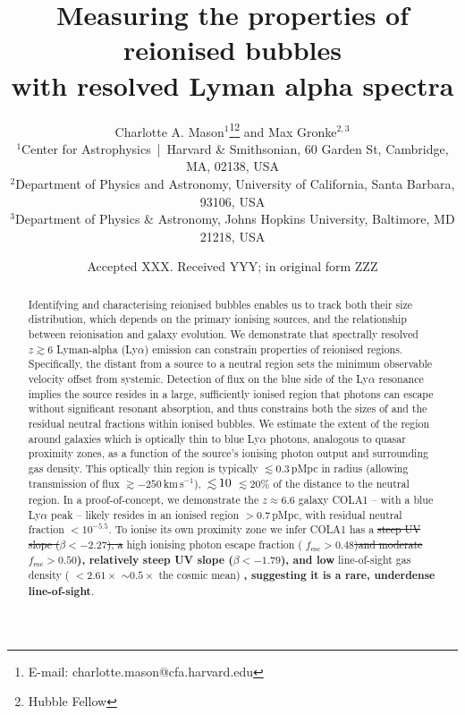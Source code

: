 \documentclass[fleqn,usenatbib]{mnras}
\title[Properties of reionised bubbles]{Measuring the properties of reionised bubbles\\with resolved Lyman alpha spectra}
\author[Mason and Gronke]{Charlotte A. Mason$^{1}$\thanks{E-mail: charlotte.mason@cfa.harvard.edu}\thanks{Hubble Fellow}
and Max Gronke$^{2,3}$\href{Hfootnote.2}{\samethanks}
\\
$^{1}$Center for Astrophysics \,|\, Harvard \& Smithsonian, 60 Garden St, Cambridge, MA, 02138, USA\\
$^{2}$Department of Physics and Astronomy, University of California, Santa Barbara, 93106, USA\\
$^{3}$Department of Physics \& Astronomy, Johns Hopkins University, Baltimore, MD 21218, USA
}
\date{Accepted XXX. Received YYY; in original form ZZZ}
\providecommand{\DIFadd}[1]{{\protect\color{Green} \bf #1}} %
\providecommand{\DIFdel}[1]{{\protect\color{lightgray} \footnotesize \sout{#1}}} %
\providecommand{\DIFaddbegin}{} %
\providecommand{\DIFaddend}{} %
\providecommand{\DIFdelbegin}{} %
\providecommand{\DIFdelend}{} %
\newcommand{\DIFscaledelfig}{0.5}
\newlength{\DIFdelgraphicswidth} %
\newlength{\DIFdelgraphicsheight} %
\newcommand{\DIFaddincludegraphics}[2][]{{\color{blue}\fbox{\DIFOincludegraphics[#1]{#2}}}} %
\newcommand{\DIFdelincludegraphics}[2][]{%
\sbox{\DIFdelgraphicsbox}{\DIFOincludegraphics[#1]{#2}}%
\settoboxwidth{\DIFdelgraphicswidth}{\DIFdelgraphicsbox} %
\settoboxtotalheight{\DIFdelgraphicsheight}{\DIFdelgraphicsbox} %
\scalebox{\DIFscaledelfig}{%
\parbox[b]{\DIFdelgraphicswidth}{\usebox{\DIFdelgraphicsbox}\\[-\baselineskip] \rule{\DIFdelgraphicswidth}{0em}}\llap{\resizebox{\DIFdelgraphicswidth}{\DIFdelgraphicsheight}{%
\setlength{\unitlength}{\DIFdelgraphicswidth}%
\begin{picture}(1,1)%
\thicklines\linethickness{2pt} %
{\color[rgb]{1,0,0}\put(0,0){\framebox(1,1){}}}%
{\color[rgb]{1,0,0}\put(0,0){\line( 1,1){1}}}%
{\color[rgb]{1,0,0}\put(0,1){\line(1,-1){1}}}%
\end{picture}%
}\hspace*{3pt}}} %
} %
\DeclareRobustCommand{\DIFaddbegin}{\DIFOaddbegin \let\includegraphics\DIFaddincludegraphics} %
\DeclareRobustCommand{\DIFaddend}{\DIFOaddend \let\includegraphics\DIFOincludegraphics} %
\DeclareRobustCommand{\DIFdelbegin}{\DIFOdelbegin \let\includegraphics\DIFdelincludegraphics} %
\DeclareRobustCommand{\DIFdelend}{\DIFOaddend \let\includegraphics\DIFOincludegraphics} %
\begin{document}
\label{firstpage}
\pagerange{\pageref{firstpage}--\pageref{lastpage}}
\maketitle

\begin{abstract}
%
Identifying and characterising reionised bubbles enables us to track both their size distribution, which depends on the primary ionising sources, and the relationship between reionisation and galaxy evolution.
%
We demonstrate that spectrally resolved $z\gtrsim6$ Lyman-alpha (Ly$\alpha$) emission can constrain properties of reionised regions.
%
Specifically, the distant from a source to a neutral region sets the minimum observable \lya velocity offset from systemic. Detection of flux on the blue side of the Ly$\alpha$ resonance implies the source resides in a large, sufficiently ionised region that photons can escape without significant resonant absorption, and thus constrains both the sizes of and the residual neutral fractions within ionised bubbles. 
%
We estimate the extent of the region around galaxies which is optically thin to blue Ly$\alpha$ photons, analogous to quasar proximity zones, as a function of the source's ionising photon output and surrounding gas density.
This optically thin region is typically $\lesssim 0.3$\,pMpc in radius (allowing transmission of flux $\gtrsim -250$\,km\,s$^{-1}$), \DIFdelbegin \DIFdel{$\simlt 10$}\DIFdelend \DIFaddbegin \DIFadd{$\lesssim 20$}\DIFaddend \% of the distance to the neutral region.
%
In a proof-of-concept, we demonstrate the $z\approx6.6$ galaxy COLA1 -- with a blue Ly$\alpha$ peak -- likely resides in an ionised region $>0.7$\,pMpc, with residual neutral fraction $<10^{-5.5}$. To ionise its own proximity zone we infer COLA1 has a \DIFdelbegin \DIFdel{steep UV slope ($\beta < -2.27$), a }\DIFdelend high ionising photon escape fraction (\DIFdelbegin \DIFdel{$f_{\mathrm{esc}}>0.48$)and moderate }\DIFdelend \DIFaddbegin \DIFadd{$f_{\mathrm{esc}}>0.50$), relatively steep UV slope ($\beta < -1.79$), and low }\DIFaddend line-of-sight gas density (\DIFdelbegin \DIFdel{$<2.61\times$ }\DIFdelend \DIFaddbegin \DIFadd{$\sim0.5\times$ }\DIFaddend the cosmic mean)\DIFaddbegin \DIFadd{, suggesting it is a rare, underdense line-of-sight}\DIFaddend .
%
\end{abstract}
\end{document}
